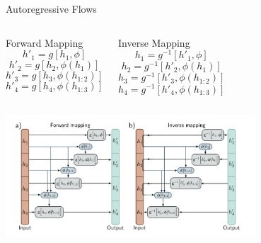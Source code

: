 \documentclass[aspectratio=169,xcolor=dvipsnames]{beamer}
\begin{document}
\begin{frame}{Autoregressive Flows}

\begin{columns}[T,onlytextwidth]
  \begin{block}{Forward Mapping}
    \[
    h'_1 = g[h_1, \phi]
    \]
    \[
    h'_2 = g[h_2, \phi(h_1)]
    \]
    \[
    h'_3 = g[h_3, \phi(h_{1:2})]
    \]
    \[
    h'_4 = g[h_4, \phi(h_{1:3})]
    \]
  \end{block}

  \begin{block}{Inverse Mapping}
    \[
    h_1 = g^{-1}[h'_1, \phi]
    \]
    \[
    h_2 = g^{-1}[h'_2, \phi(h_1)]
    \]
    \[
    h_3 = g^{-1}[h'_3, \phi(h_{1:2})]
    \]
    \[
    h_4 = g^{-1}[h'_4, \phi(h_{1:3})]
    \]
  \end{block}
\end{columns}

\vspace{0.5cm}

\begin{center}
  \includegraphics[width=0.7\textwidth]{pictures/Autoregressive_Flows.png}
\end{center}

\end{frame}
\end{document}
